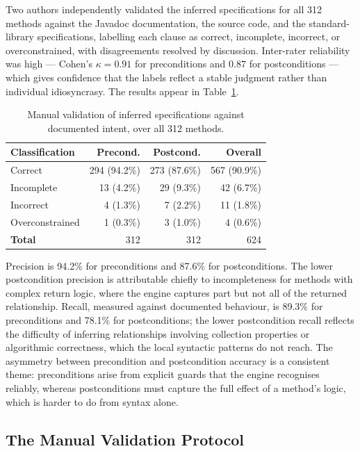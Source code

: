 Two authors independently validated the inferred specifications for all 312
methods against the Javadoc documentation, the source code, and the standard-
library specifications, labelling each clause as correct, incomplete,
incorrect, or overconstrained, with disagreements resolved by discussion.
Inter-rater reliability was high --- Cohen's $\kappa = 0.91$ for preconditions
and $0.87$ for postconditions --- which gives confidence that the labels
reflect a stable judgment rather than individual idiosyncrasy. The results
appear in Table~\ref{tab:tg-validation}.

\begin{table}[ht]
\centering
\caption{Manual validation of inferred specifications against documented
intent, over all 312 methods.}
\label{tab:tg-validation}
\begin{tabular}{lrrr}
\toprule
\textbf{Classification} & \textbf{Precond.} & \textbf{Postcond.} & \textbf{Overall} \\
\midrule
Correct & 294 (94.2\%) & 273 (87.6\%) & 567 (90.9\%) \\
Incomplete & 13 (4.2\%) & 29 (9.3\%) & 42 (6.7\%) \\
Incorrect & 4 (1.3\%) & 7 (2.2\%) & 11 (1.8\%) \\
Overconstrained & 1 (0.3\%) & 3 (1.0\%) & 4 (0.6\%) \\
\midrule
\textbf{Total} & 312 & 312 & 624 \\
\bottomrule
\end{tabular}
\end{table}

Precision is 94.2\% for preconditions and 87.6\% for postconditions. The lower
postcondition precision is attributable chiefly to incompleteness for methods
with complex return logic, where the engine captures part but not all of the
returned relationship. Recall, measured against documented behaviour, is 89.3\%
for preconditions and 78.1\% for postconditions; the lower postcondition recall
reflects the difficulty of inferring relationships involving collection
properties or algorithmic correctness, which the local syntactic patterns do
not reach. The asymmetry between precondition and postcondition accuracy is a
consistent theme: preconditions arise from explicit guards that the engine
recognises reliably, whereas postconditions must capture the full effect of a
method's logic, which is harder to do from syntax alone.

\subsection{The Manual Validation Protocol}

